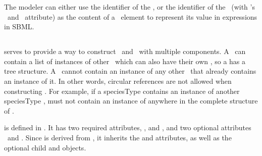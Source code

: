 The modeler can either use the identifier of the \parameter, or the identifier of the \possibleSpeciesFeatureValue\ (with 's \representationTypeAtt\ and \speciesReferenceAtt\ attribute) as the content of a \ci\ element to represent its value in  expressions in SBML.

\clearpage

\subsection{} 
\label{def:SpeciesTypeInstance}

 serves to provide a way to construct \speciesTypes\ and \species\ with multiple components. A \speciesType\ can contain a list of instances of other \speciesTypes\ which can also have their own \speciesTypeInstances, \mBlockChangedBegin{\revTwentyTwentyMarch}so a \speciesType\mBlockChangedEnd{\revTwentyTwentyMarch} has a tree structure. A \speciesType\ cannot contain an instance of any other \speciesType\ that already contains \mBlockChangedBegin{\revTwentyTwentyMarch}an\mBlockChangedEnd{\revTwentyTwentyMarch} instance of it. In other words,  circular references are not allowed when constructing \speciesTypes. For example, if a speciesType  contains \mBlockChangedBegin{\revTwentyTwentyMarch}an\mBlockChangedEnd{\revTwentyTwentyMarch} instance of another speciesType ,  must not contain \mBlockChangedBegin{\revTwentyTwentyMarch}an\mBlockChangedEnd{\revTwentyTwentyMarch} instance of  anywhere in the complete structure of .

 is defined in . It has two required attributes, \idAtt, and \speciesTypeAtt, and two optional attributes \nameAtt\ and \compartmentReferenceAtt. Since  is derived from , it inherits the  and  attributes, as well as the optional \mBlockChangedBegin{\revTwentyTwentyMarch}child\mBlockChangedEnd{\revTwentyTwentyMarch}  and  objects.

